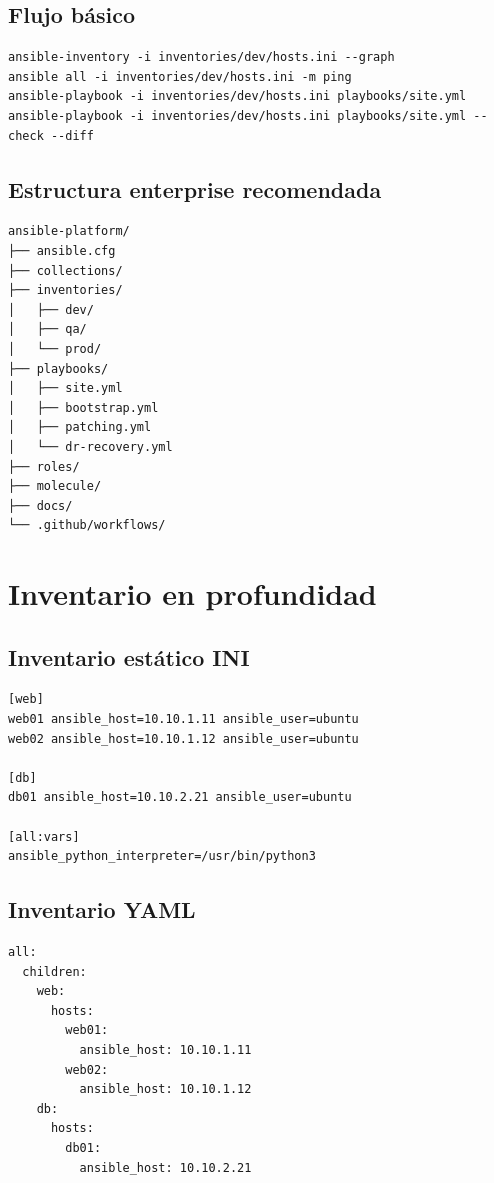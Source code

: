\documentclass[12pt,a4paper]{article}
\begin{document}
\subsection{Flujo básico}
\begin{lstlisting}[caption=Comandos esenciales]
ansible-inventory -i inventories/dev/hosts.ini --graph
ansible all -i inventories/dev/hosts.ini -m ping
ansible-playbook -i inventories/dev/hosts.ini playbooks/site.yml
ansible-playbook -i inventories/dev/hosts.ini playbooks/site.yml --check --diff
\end{lstlisting}

\subsection{Estructura enterprise recomendada}
\begin{lstlisting}[caption=Blueprint de repositorio Ansible]
ansible-platform/
├── ansible.cfg
├── collections/
├── inventories/
│   ├── dev/
│   ├── qa/
│   └── prod/
├── playbooks/
│   ├── site.yml
│   ├── bootstrap.yml
│   ├── patching.yml
│   └── dr-recovery.yml
├── roles/
├── molecule/
├── docs/
└── .github/workflows/
\end{lstlisting}

\section{Inventario en profundidad}

\subsection{Inventario estático INI}
\begin{lstlisting}[caption=hosts.ini]
[web]
web01 ansible_host=10.10.1.11 ansible_user=ubuntu
web02 ansible_host=10.10.1.12 ansible_user=ubuntu

[db]
db01 ansible_host=10.10.2.21 ansible_user=ubuntu

[all:vars]
ansible_python_interpreter=/usr/bin/python3
\end{lstlisting}

\subsection{Inventario YAML}
\begin{lstlisting}[caption=hosts.yml]
all:
  children:
    web:
      hosts:
        web01:
          ansible_host: 10.10.1.11
        web02:
          ansible_host: 10.10.1.12
    db:
      hosts:
        db01:
          ansible_host: 10.10.2.21
\end{lstlisting}
\end{document}
